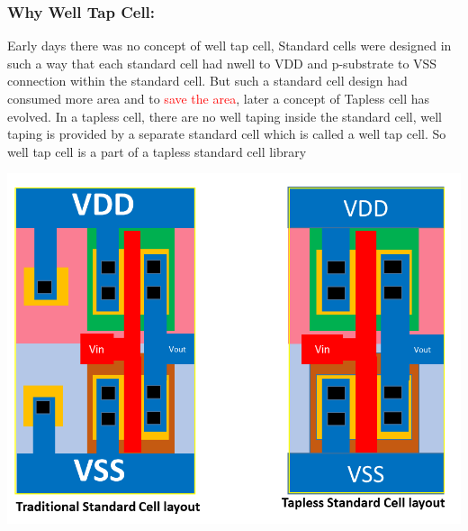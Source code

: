 \documentclass{beamer}
\begin{document}
	\begin{frame}
	\frametitle{Why Well Tap Cell:}
	Early days there was no concept of well tap cell, Standard cells were designed in such a way that each standard cell had nwell to VDD and p-substrate to VSS connection within the standard cell.
	But such a standard cell design had consumed more area and to \textcolor{red} {save the area}, later a concept of Tapless cell has evolved. 
	In a tapless cell, there are no well taping inside the standard cell, well taping is provided by a separate standard cell which is called a well tap cell. So well tap cell is a part of a tapless standard cell library
	\begin{center}
		\includegraphics[width=0.4 \textwidth]{TaplessCell}
	\end{center}		
\end{frame}	
\end{document}
